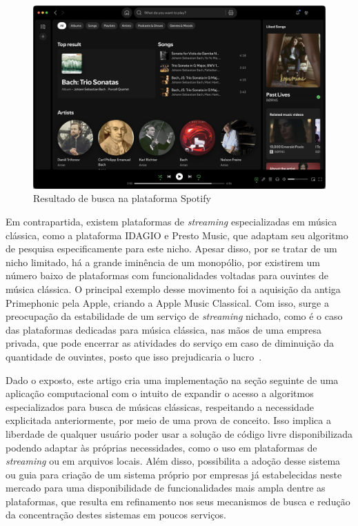 \documentclass[12pt]{article}
\begin{document}
\begin{figure}[ht]
\centering
\includegraphics[width=1\textwidth]{figuras/Spotify.png}
\caption{Resultado de busca na plataforma Spotify}
\label{fig:spotify}
\end{figure}

Em contrapartida, existem plataformas de \emph{streaming} especializadas em
música clássica, como a plataforma IDAGIO e Presto Music, que adaptam seu
algoritmo de pesquisa especificamente para este nicho. Apesar disso, por se
tratar de um nicho limitado, há a grande iminência de um monopólio, por
existirem um número baixo de plataformas com funcionalidades voltadas para
ouvintes de música clássica. O principal exemplo desse movimento foi a aquisição
da antiga Primephonic pela Apple, criando a Apple Music Classical.
Com isso, surge a preocupação da estabilidade de um serviço de \emph{streaming}
nichado, como é o caso das plataformas dedicadas para música clássica, nas mãos
de uma empresa privada, que pode encerrar as atividades do serviço em caso de
diminuição da quantidade de ouvintes, posto que isso prejudicaria o lucro~\cite{Bl:25}.

Dado o exposto, este artigo cria uma implementação na seção seguinte de uma aplicação
computacional com o intuito de expandir o acesso a algoritmos especializados para busca
de músicas clássicas, respeitando a necessidade explicitada anteriormente, por
meio de uma prova de conceito. Isso implica a liberdade de qualquer usuário
poder usar a solução de código livre disponibilizada podendo adaptar às próprias
necessidades, como o uso em plataformas de \emph{streaming} ou em arquivos
locais. Além disso, possibilita a adoção desse sistema ou guia para criação de um sistema
próprio por empresas já estabelecidas neste mercado
para uma disponibilidade de funcionalidades mais
ampla dentre as plataformas, que resulta em refinamento nos seus mecanismos de busca e redução
da concentração destes sistemas em poucos serviços.
\end{document}
